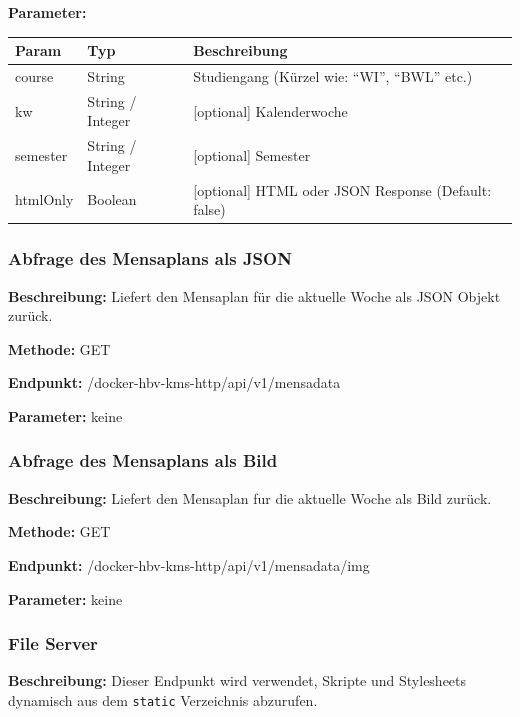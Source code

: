 \textbf{Parameter:}
\begin{table}[H]
    \label{table:/docker-hbv-kms-http/api/v1/timetable}
    \setlength{\tabcolsep}{3pt}
    \begin{tabular}{p{100pt}p{80pt}p{200pt}}
        \toprule
        Param    & Typ              & Beschreibung                                        \\
        \midrule
        course   & String           & Studiengang (Kürzel wie: ``WI'', ``BWL'' etc.)      \\
        kw       & String / Integer & [optional] Kalenderwoche                            \\
        semester & String / Integer & [optional] Semester                                 \\
        htmlOnly & Boolean          & [optional] HTML oder JSON Response (Default: false) \\
        \bottomrule
    \end{tabular}
\end{table}
\dotfill


\subsubsection{Abfrage des Mensaplans als JSON}
\label{sec:api-mensa-json}
\textbf{Beschreibung:} Liefert den Mensaplan für die aktuelle Woche als JSON Objekt zurück.

\textbf{Methode:} GET

\textbf{Endpunkt:} /docker-hbv-kms-http/api/v1/mensadata

\textbf{Parameter:} keine

\dotfill

\subsubsection{Abfrage des Mensaplans als Bild}
\label{sec:api-mensa-img}
\textbf{Beschreibung:} Liefert den Mensaplan fur die aktuelle Woche als Bild zurück.

\textbf{Methode:} GET

\textbf{Endpunkt:} /docker-hbv-kms-http/api/v1/mensadata/img

\textbf{Parameter:} keine

\dotfill

\subsubsection{File Server}
\label{sec:api-fileserver}
\textbf{Beschreibung:} Dieser Endpunkt wird verwendet, Skripte und Stylesheets dynamisch aus dem \verb|static| Verzeichnis
abzurufen.

